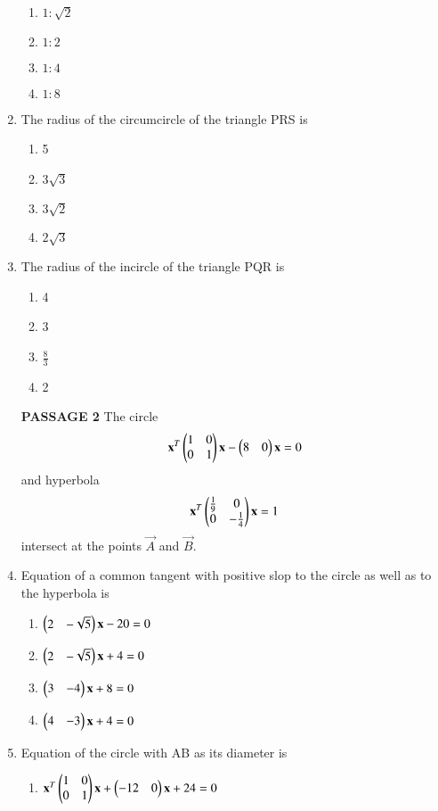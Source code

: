 \documentclass[journal,12pt,twocolumn]{IEEEtran}
\begin{document}
\begin{enumerate}[label=\arabic*]
    \begin{enumerate}
    \item $1:\sqrt{2}$
    \item $1:2$
    \item $1:4$
    \item $1:8$
    \end{enumerate}
    \item The radius of the circumcircle of the triangle PRS is
    \begin{enumerate}
    \item 5
    \item $3\sqrt{3}$
    \item $3\sqrt{2}$
    \item $2\sqrt{3}$
    \end{enumerate}
    \item The radius of the incircle of the triangle PQR is
    \begin{enumerate}
    \item 4
    \item 3
    \item $\frac{8}{3}$
    \item 2
    \end{enumerate}
    \textbf{PASSAGE 2}
    The circle
    \begin{align}
    \mathbf{x}^T\begin{pmatrix}1&0\\0&1\end{pmatrix}\mathbf{x}-\begin{pmatrix}8&0\end{pmatrix}\mathbf{x}=0
    \end{align} and hyperbola 
    \begin{align}
    \mathbf{x}^T\begin{pmatrix}\frac{1}{9}&0\\0&-\frac{1}{4}\end{pmatrix}\mathbf{x}=1 
    \end{align} intersect at the points $\vec{A}$ and $\vec{B}$.
    \item Equation of a common tangent with positive slop to the circle as well as to the hyperbola 		is
    \begin{enumerate}
    \item $\begin{pmatrix}2&-\sqrt{5}\end{pmatrix}\mathbf{x}-20=0$
    \item $\begin{pmatrix}2&-\sqrt{5}\end{pmatrix}\mathbf{x}+4=0$
    \item $\begin{pmatrix}3&-4\end{pmatrix}\mathbf{x}+8=0$
    \item $\begin{pmatrix}4&-3\end{pmatrix}\mathbf{x}+4=0$
    \end{enumerate}
    \item Equation of the circle with AB as its diameter is
    \begin{enumerate}
    \item $\mathbf{x}^T\begin{pmatrix}1&0\\0&1\end{pmatrix}\mathbf{x}+\begin{pmatrix}-12&0\end{pmatrix}\mathbf{x}+24=0$

\end{enumerate}
\end{enumerate}
\end{document}
